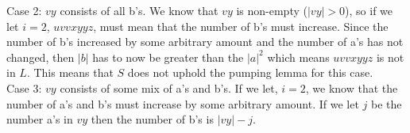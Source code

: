 \documentclass[11pt]{article}
\theoremstyle{definition}
\theoremstyle{theorem}
\begin{document}
\begin{enumerate}[label=(\alph*)]
\begin{enumerate}[label=(\alph*)]
Case 2: $vy$ consists of all b's. We know that $vy$ is non-empty ($|vy| > 0$), so if we let $i = 2$, $uvvxyyz$, must mean that the number of b's must increase. Since the number of b's increased by some arbitrary amount and the number of a's has not changed, then $|b|$ has to now be greater than the $|a|^2$ which means $uvvxyyz$ is not in $L$. This means that $S$ does not uphold the pumping lemma for this case. \\

Case 3: $vy$ consists of some mix of a's and b's. If we let, $i = 2$, we know that the number of a's and b's must increase by some arbitrary amount.  If we let $j$ be the number a's in $vy$ then the number of b's is $|vy| - j$.
\end{enumerate}



\end{enumerate}
\end{document}
